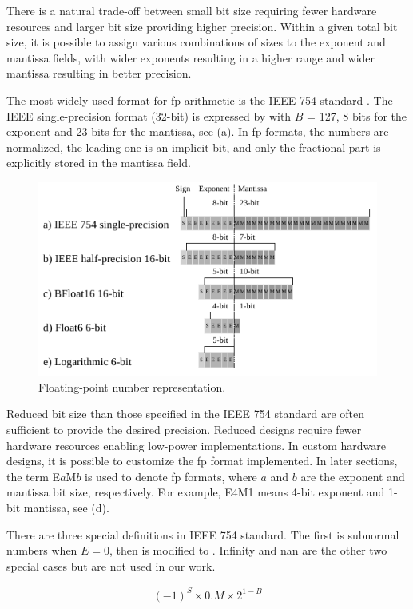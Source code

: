 There is a natural trade-off between small bit size requiring fewer hardware resources and larger bit size providing higher precision. Within a given total bit size, it is possible to assign various combinations of sizes to the exponent and mantissa fields, with wider exponents resulting in a higher range and wider mantissa resulting in better precision.

The most widely used format for \gls{fp} arithmetic is the IEEE 754 standard \cite{zuras2008ieee}. The IEEE single-precision format (32-bit) is expressed by  with $B$ = 127, 8 bits for the exponent and 23 bits for the mantissa, see (a). In \gls{fp} formats, the numbers are normalized, the leading one is an implicit bit, and only the fractional part is explicitly stored in the mantissa field.

\begin{figure}
	\centering
	\includegraphics[width=0.5\columnwidth]{./chapters/cnn_accelerator/figures/power_breakdown/floating_point.pdf}
	\caption{Floating-point number representation.}
	\label{fig:floating}
\end{figure}

Reduced bit size than those specified in the IEEE 754 standard are often sufficient to provide the desired precision. Reduced designs require fewer hardware resources enabling low-power implementations. In custom hardware designs, it is possible to customize the \gls{fp} format implemented. In later sections, the term E$a$M$b$ is used to denote \gls{fp} formats, where $a$ and $b$ are the exponent and mantissa bit size, respectively. For example, E4M1 means 4-bit exponent and 1-bit mantissa, see (d).

There are three special definitions in IEEE 754 standard. The first is subnormal numbers when $E=0$, then  is modified to . Infinity and \gls{nan} are the other two special cases but are not used in our work.

\begin{eqnarray} \label{eq:float_subnorm}
(-1)^{S} \times 0.M \times 2^{1-B}
\end{eqnarray}


